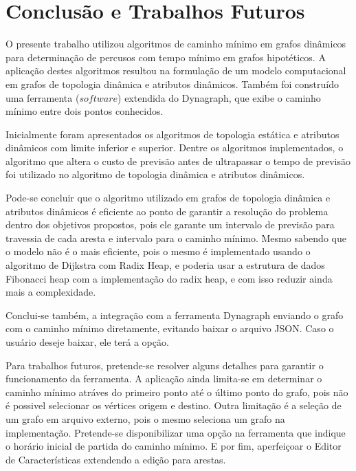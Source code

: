 \chapter{Conclusão e Trabalhos Futuros}

O presente trabalho utilizou algoritmos de caminho mínimo em grafos dinâmicos
para determinação de percusos com tempo mínimo em grafos hipotéticos.
A aplicação destes algoritmos resultou na formulação de um modelo computacional em grafos
de topologia dinâmica e atributos dinâmicos. Também foi construído uma ferramenta ($software$)
extendida do Dynagraph, que exibe o caminho mínimo entre dois pontos conhecidos.

Inicialmente foram apresentados os algoritmos de topologia estática e atributos dinâmicos com
limite inferior e superior.
Dentre os algoritmos implementados, o algoritmo que altera o custo de previsão antes de ultrapassar o tempo
de previsão foi utilizado no algoritmo de topologia dinâmica e atributos dinâmicos.

Pode-se concluir que o algoritmo utilizado em grafos de topologia dinâmica e atributos dinâmicos
é eficiente ao ponto de garantir a resolução do problema dentro dos objetivos propostos, pois ele
garante um intervalo de previsão para travessia de cada aresta e intervalo para o caminho mínimo.
Mesmo sabendo que o modelo não é o mais eficiente, pois o mesmo é implementado usando o
algoritmo de Dijkstra com Radix Heap, e poderia usar a estrutura de dados Fibonacci heap com a
implementação do radix heap, e com isso reduzir ainda mais a complexidade.

Conclui-se também, a integração com a ferramenta Dynagraph enviando o grafo
com o caminho mínimo diretamente, evitando baixar o arquivo JSON. Caso o usuário deseje baixar, ele terá a opção.

Para trabalhos futuros, pretende-se resolver alguns detalhes para garantir o funcionamento da ferramenta.
A aplicação ainda limita-se em determinar o caminho mínimo atráves do primeiro ponto até o último
ponto do grafo, pois não é possivel selecionar os vértices origem e destino. Outra limitação é a
seleção de um grafo em arquivo externo, pois o mesmo seleciona um grafo na implementação.
Pretende-se disponibilizar uma opção na ferramenta que indique o horário inicial de partida
do caminho mínimo. E por fim, aperfeiçoar o Editor de Características extendendo a edição para arestas.
